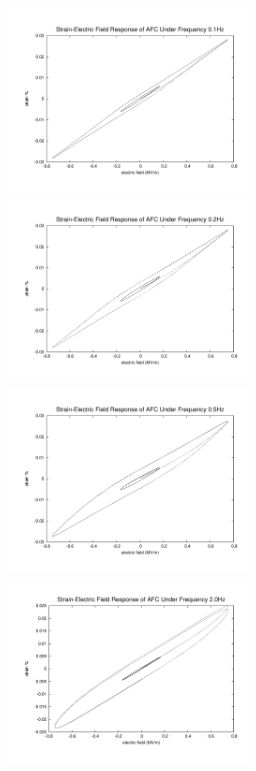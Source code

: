 \begin{figure}
\centering
{}
{\includegraphics[width=2.5in]{./chap_4_structural_analyses/afc_unit_cell/frequency_effect/electric_field_vs_strains_freq_0p1}}
{\includegraphics[width=2.5in]{./chap_4_structural_analyses/afc_unit_cell/frequency_effect/electric_field_vs_strains_freq_0p2}}
{\includegraphics[width=2.5in]{./chap_4_structural_analyses/afc_unit_cell/frequency_effect/electric_field_vs_strains_freq_0p5}}
{\includegraphics[width=2.5in]{./chap_4_structural_analyses/afc_unit_cell/frequency_effect/electric_field_vs_strains_freq_2p0}}

\end{figure}
